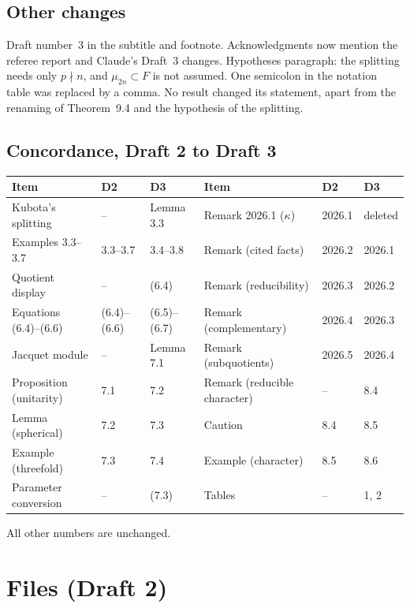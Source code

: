 \documentclass[12pt,letterpaper]{article}
\begin{document}
\subsection{Other changes}
Draft number~3 in the subtitle and footnote. Acknowledgments now
mention the referee report and Claude's Draft~3 changes. Hypotheses
paragraph: the splitting needs only $p\nmid n$, and $\mu_{2n}\subset F$
is not assumed. One semicolon in the notation table was replaced by a
comma. No result changed its statement, apart from the renaming of
Theorem~9.4 and the hypothesis of the splitting.

\subsection{Concordance, Draft 2 to Draft 3}
\begin{center}
\small
\begin{tabular}{@{}lll@{\qquad}lll@{}}
\toprule
Item & D2 & D3 & Item & D2 & D3\\
\midrule
Kubota's splitting & -- & Lemma 3.3 & Remark 2026.1 ($\kappa$) & 2026.1 & deleted\\
Examples 3.3--3.7 & 3.3--3.7 & 3.4--3.8 & Remark (cited facts) & 2026.2 & 2026.1\\
Quotient display & -- & (6.4) & Remark (reducibility) & 2026.3 & 2026.2\\
Equations (6.4)--(6.6) & (6.4)--(6.6) & (6.5)--(6.7) & Remark (complementary) & 2026.4 & 2026.3\\
Jacquet module & -- & Lemma 7.1 & Remark (subquotients) & 2026.5 & 2026.4\\
Proposition (unitarity) & 7.1 & 7.2 & Remark (reducible character) & -- & 8.4\\
Lemma (spherical) & 7.2 & 7.3 & Caution & 8.4 & 8.5\\
Example (threefold) & 7.3 & 7.4 & Example (character) & 8.5 & 8.6\\
Parameter conversion & -- & (7.3) & Tables & -- & 1, 2\\
\bottomrule
\end{tabular}
\end{center}
All other numbers are unchanged.

\section{Files (Draft 2)}\label{sec:files}
\end{document}
